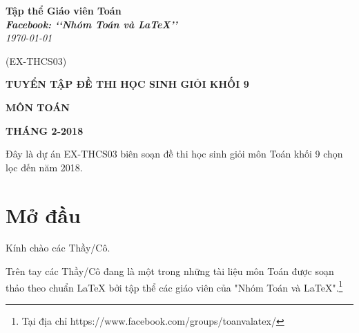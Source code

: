 \documentclass[12pt,a4paper,oneside]{book}
\renewcommand{\baselinestretch}{1.4}
\begin{document}
\providecommand*{\dx}{\ensuremath{\mathrm{\,d}}x}
\providecommand*{\unit}[1]{\ensuremath{\mathrm{\,#1}}}

\begin{titlepage}
\begin{flushright}
\fontsize{17}{0}\selectfont
\textbf{Tập thể Giáo viên Toán}\\
\textbf{\textit{Facebook: \lq\lq Nhóm Toán và LaTeX\rq\rq}}\\
\textit{\color{red}\today}

(EX-THCS03)
\end{flushright}

\vspace{4cm}

\begin{flushright}

\vspace{1cm}

 \textbf{\fontsize{30}{0}\selectfont T\fontsize{20}{0}\selectfont UYỂN TẬP ĐỀ THI HỌC SINH GIỎI KHỐI 9}
 
 \vspace{1cm}
 
 \textbf{\fontsize{35}{0}\selectfont MÔN TOÁN}
 
\end{flushright}


\vfill{
\begin{flushright}
\fontsize{17}{0}\textbf{THÁNG 2-2018}
\end{flushright}
}
\end{titlepage}
\pagestyle{empty}
\renewcommand{\headrulewidth}{0.4pt}

{\renewcommand{\baselinestretch}{1.3}
	\newpage
	Đây là dự án EX-THCS03 biên soạn đề thi học sinh giỏi môn Toán khối 9 chọn lọc đến năm 2018.
	\newpage
\tableofcontents
}

\pagestyle{fancy}
\lhead{\empty}
\rhead{\empty}
\lfoot{\currfilename}

\chapter*{Mở đầu}
Kính chào các Thầy/Cô.

\vspace{0.6cm}

\noindent Trên tay các Thầy/Cô đang là một trong những tài liệu môn Toán được soạn thảo theo chuẩn \LaTeX{} bởi tập thể các giáo viên của "Nhóm Toán và LaTeX".\footnote{Tại địa chỉ https://www.facebook.com/groups/toanvalatex/}
\end{document}
